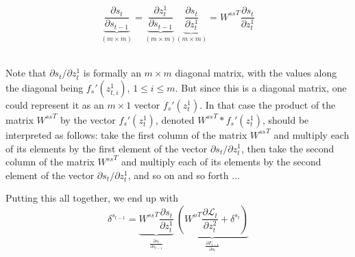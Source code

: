\begin{enumerate}[(1)]

        \begin{equation}
          \underbrace{\frac{\partial s_t}{\partial s_{t - 1}}}_{(m \times m)}
          = \underbrace{\frac{\partial z_t^1}{\partial s_{t - 1}}}_{(m \times
            m)} \underbrace{\frac{\partial s_t}{\partial z_t^1}}_{(m
            \times m)} = {W^{ss}}^T \frac{\partial s_t}{\partial z_t^1}
        \end{equation} \\
        \begin{examplebox} Note that $\partial s_t /\partial z^1_t$
          is formally an $m \times m$ diagonal matrix, with the values
          along the diagonal being $f_{s}'(z_{t,i}^1)$, $1 \leq i \leq m$. But since this is a diagonal matrix, one could represent it as an $m \times 1$ vector $f_{s}'(z_t^1)$. In that case the product of the matrix ${W^{ss}}^T$ by the vector $f_{s}'(z_t^1)$, denoted ${W^{ss}}^T * f_{s}'(z_t^1)$, should be interpreted as follows: take the first column of the matrix ${W^{ss}}^T$ and multiply each of its elements by the first element of the vector $\partial s_t /\partial z^1_t$, then take the second column of the matrix ${W^{ss}}^T$ and multiply each of its elements by the second element of the vector $\partial s_t /\partial z^1_t$, and so on and so forth ...
        \end{examplebox}

        Putting this all together, we end up with
        \begin{equation}
          \delta^{s_{t - 1}} = \underbrace{{W^{ss}}^T \frac{\partial s_t}{\partial z_t^1}}_{\frac{\partial s_t}{\partial s_{t - 1}}} ~ \underbrace{\left({W^o}^T\frac{\partial{\mathcal{L}_t}}{\partial z_t^2} + \delta^{s_t}\right)}_{\frac{\partial F_{t - 1}}{\partial s_t}}
        \end{equation}


\end{enumerate}
